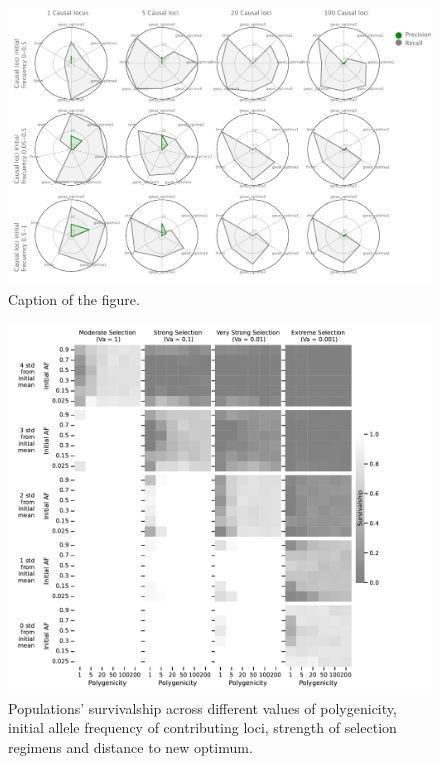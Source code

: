\documentclass{article}
\begin{document}
\begin{figure}[b]
    \centering
    \includegraphics[width=1\textwidth]{figures/metrics.pdf}
    \caption{Caption of the figure.}
    \label{fig:metrics}
\end{figure}



\begin{figure}[b]
    \centering
    \includegraphics[width=1\textwidth]{figures/survivalshipforh2-1.pdf}
    \caption{Populations' survivalship across different values of polygenicity, initial allele frequency of contributing loci, strength of selection regimens and distance to new optimum.}
    \label{fig:survivalshipforh2}
\end{figure}
\end{document}
